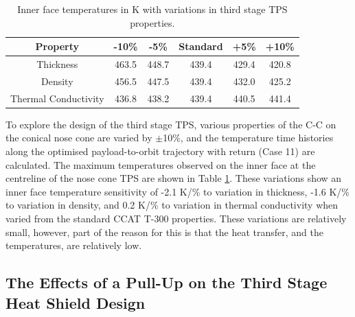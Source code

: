 \begin{table}[!ht]
	\centering
	\begin{tabular}{|c|c|c|c|c|c|}
		\hline Property & -10\% & -5\% & Standard & +5\% & +10\% \\ 
		\hline Thickness & 463.5 & 448.7 & 439.4 &  429.4 & 420.8  \\ 
		\hline Density &  456.5 & 447.5 & 439.4 & 432.0 &  425.2\\ 
		\hline Thermal Conductivity & 436.8 & 438.2 & 439.4 & 440.5 & 441.4 \\ 
		\hline 
	\end{tabular} 
	
	\caption{Inner face temperatures in K with variations in third stage TPS properties.}
	\label{tab:tpsthirdstage}
\end{table}

To explore the design of the third stage TPS, various properties of the C-C on the conical nose cone are varied by $\pm$10\%, and the temperature time histories along the optimised payload-to-orbit trajectory with return (Case 11) are calculated. The maximum temperatures observed on the inner face at the centreline of the nose cone TPS are shown in Table \ref{tab:tpsthirdstage}. These variations show an inner face temperature sensitivity of -2.1 K/\% to variation in thickness, -1.6 K/\% to variation in density, and 0.2 K/\% to variation in thermal conductivity when varied from the standard CCAT T-300 properties. These variations are relatively small, however, part of the reason for this is that the heat transfer, and the temperatures, are relatively low. 






\subsection{The Effects of a Pull-Up on the Third Stage Heat Shield Design}\label{sec:TPSredesign}


